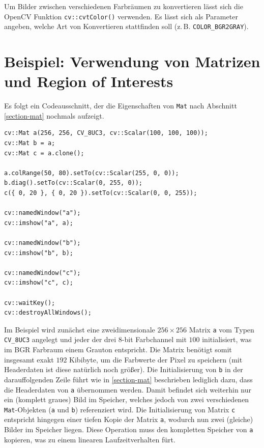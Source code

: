 \documentclass{whswinvcbook}
\begin{document}
Um Bilder zwischen verschiedenen Farbräumen zu konvertieren lässt sich die OpenCV Funktion \texttt{cv::cvtColor()} verwenden. Es lässt sich als Parameter angeben, welche Art von Konvertieren stattfinden soll (z.\,B. \texttt{COLOR\_BGR2GRAY}).\cite{opencv5}

\section{Beispiel: Verwendung von Matrizen und Region of Interests}
Es folgt ein Codeausschnitt, der die Eigenschaften von \texttt{Mat} nach Abschnitt \ref{section-mat} nochmals aufzeigt.
\begin{lstlisting}[caption=Verwendung von Mat und ROI, label=lst-mat-example]
cv::Mat a(256, 256, CV_8UC3, cv::Scalar(100, 100, 100));
cv::Mat b = a;
cv::Mat c = a.clone();

a.colRange(50, 80).setTo(cv::Scalar(255, 0, 0));
b.diag().setTo(cv::Scalar(0, 255, 0));
c({ 0, 20 }, { 0, 20 }).setTo(cv::Scalar(0, 0, 255));

cv::namedWindow("a");
cv::imshow("a", a);

cv::namedWindow("b");
cv::imshow("b", b);

cv::namedWindow("c");
cv::imshow("c", c);

cv::waitKey();
cv::destroyAllWindows();
\end{lstlisting}
Im Beispiel wird zunächst eine zweidimensionale $256\times256$ Matrix \texttt{a} vom Typen \texttt{CV\_8UC3} angelegt und jeder der drei 8-bit Farbchannel mit $100$ initialisiert, was im BGR Farbraum einem Grauton entspricht. Die Matrix benötigt somit insgesamt exakt $192$ Kibibyte, um die Farbwerte der Pixel zu speichern (mit Headerdaten ist diese natürlich noch größer). Die Initialisierung von \texttt{b} in der darauffolgenden Zeile führt wie in \ref{section-mat} beschrieben lediglich dazu, dass die Headerdaten von \texttt{a} übernommen werden. Damit befindet sich weiterhin nur ein (komplett graues) Bild im Speicher, welches jedoch von zwei verschiedenen \texttt{Mat}-Objekten (\texttt{a} und \texttt{b}) referenziert wird. Die Initialisierung von Matrix \texttt{c} entspricht hingegen einer tiefen Kopie der Matrix \texttt{a}, wodurch nun zwei (gleiche) Bilder im Speicher liegen. Diese Operation muss den kompletten Speicher von \texttt{a} kopieren, was zu einem linearen Laufzeitverhalten fürt.
\end{document}
